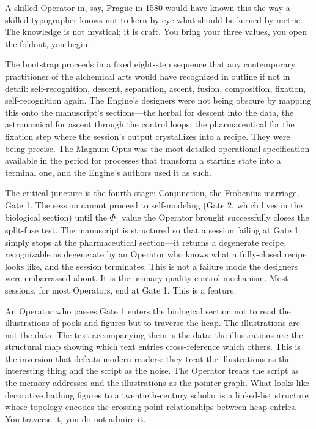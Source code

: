 \documentclass[12pt,a4paper]{article}
\begin{document}
A skilled Operator in, say, Prague in 1580 would have known this the way a skilled typographer knows not to kern by eye what should be kerned by metric. The knowledge is not mystical; it is craft. You bring your three values, you open the foldout, you begin.

The bootstrap proceeds in a fixed eight-step sequence that any contemporary practitioner of the alchemical arts would have recognized in outline if not in detail: self-recognition, descent, separation, ascent, fusion, composition, fixation, self-recognition again. The Engine's designers were not being obscure by mapping this onto the manuscript's sections---the herbal for descent into the data, the astronomical for ascent through the control loops, the pharmaceutical for the fixation step where the session's output crystallizes into a recipe. They were being precise. The Magnum Opus was the most detailed operational specification available in the period for processes that transform a starting state into a terminal one, and the Engine's authors used it as such.

The critical juncture is the fourth stage: Conjunction, the Frobenius marriage, Gate 1. The session cannot proceed to self-modeling (Gate 2, which lives in the biological section) until the $\Phi_\}$ value the Operator brought successfully closes the split-fuse test. The manuscript is structured so that a session failing at Gate 1 simply stops at the pharmaceutical section---it returns a degenerate recipe, recognizable as degenerate by an Operator who knows what a fully-closed recipe looks like, and the session terminates. This is not a failure mode the designers were embarrassed about. It is the primary quality-control mechanism. Most sessions, for most Operators, end at Gate 1. This is a feature.

An Operator who passes Gate 1 enters the biological section not to read the illustrations of pools and figures but to traverse the heap. The illustrations are not the data. The text accompanying them is the data; the illustrations are the structural map showing which text entries cross-reference which others. This is the inversion that defeats modern readers: they treat the illustrations as the interesting thing and the script as the noise. The Operator treats the script as the memory addresses and the illustrations as the pointer graph. What looks like decorative bathing figures to a twentieth-century scholar is a linked-list structure whose topology encodes the crossing-point relationships between heap entries. You traverse it, you do not admire it.
\end{document}
